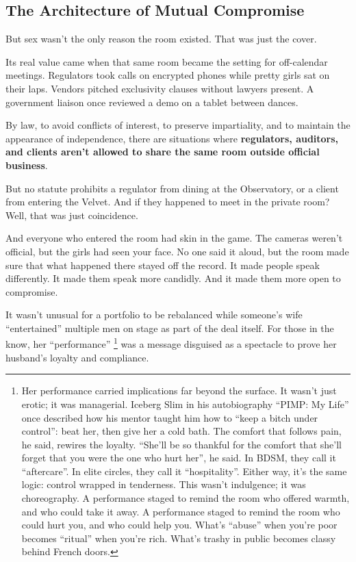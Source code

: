 
\subsection{The Architecture of Mutual Compromise}


But sex wasn’t the only reason the room existed. That was just the cover.

Its real value came when that same room became the setting for off-calendar meetings. Regulators took calls on encrypted 
phones while pretty girls sat on their laps. Vendors pitched exclusivity clauses without lawyers present. A government 
liaison once reviewed a demo on a tablet between dances.

By law, to avoid conflicts of interest, to preserve impartiality, and to maintain the appearance of independence,
there are situations where \textbf{regulators, auditors, and clients aren’t allowed to share the same room outside
official business}.

But no statute prohibits a regulator from dining at the Observatory, or a client from entering the Velvet. And if they 
happened to meet in the private room? Well, that was just coincidence.

And everyone who entered the room had skin in the game. The cameras weren’t official, but the girls had seen your face. No 
one said it aloud, but the room made sure that what happened there stayed off the record. It made people speak differently. 
It made them speak more candidly. And it made them more open to compromise.


It wasn’t unusual for a portfolio to be rebalanced while someone’s wife “entertained” multiple men on stage as part of 
the deal itself. For those in the know, her ``performance'' 
\footnote{Her performance carried implications far beyond the surface. It wasn’t just erotic; it was managerial.
Iceberg Slim in his autobiography ``PIMP: My Life'' once described how his mentor taught him how to ``keep a bitch under 
control'': beat her, then give her a cold bath. The comfort
that follows pain, he said, rewires the loyalty. ``She'll be so thankful for the comfort that she'll forget that you were 
the one who hurt her'', he said. In BDSM, they call it ``aftercare''.
In elite circles, they call it ``hospitality''. Either way, it’s the same logic: control wrapped in tenderness.
This wasn’t indulgence; it was choreography. A performance staged to remind the room who offered warmth,
and who could take it away. A performance staged to remind the room who could hurt you, and who could help you.
What’s ``abuse'' when you’re poor becomes ``ritual'' when you’re rich.
What’s trashy in public becomes classy behind French doors.}
was a message disguised as a spectacle to prove her husband's loyalty and compliance.

